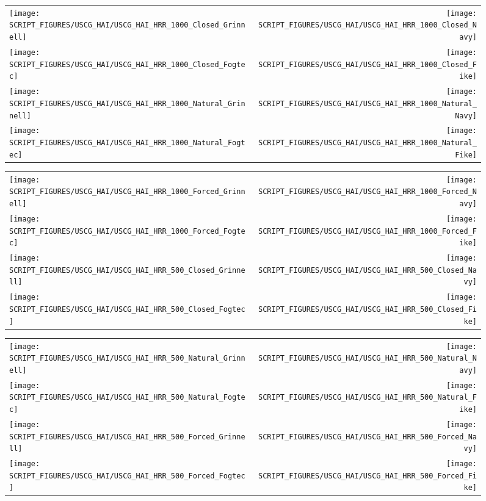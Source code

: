 


\newpage

\begin{figure}[p]
\begin{tabular*}{\textwidth}{l@{\extracolsep{\fill}}r}
\texttt{[image: SCRIPT\_FIGURES/USCG\_HAI/USCG\_HAI\_HRR\_1000\_Closed\_Grinnell]} &
\texttt{[image: SCRIPT\_FIGURES/USCG\_HAI/USCG\_HAI\_HRR\_1000\_Closed\_Navy]} \\
\texttt{[image: SCRIPT\_FIGURES/USCG\_HAI/USCG\_HAI\_HRR\_1000\_Closed\_Fogtec]} &
\texttt{[image: SCRIPT\_FIGURES/USCG\_HAI/USCG\_HAI\_HRR\_1000\_Closed\_Fike]} \\
\texttt{[image: SCRIPT\_FIGURES/USCG\_HAI/USCG\_HAI\_HRR\_1000\_Natural\_Grinnell]} &
\texttt{[image: SCRIPT\_FIGURES/USCG\_HAI/USCG\_HAI\_HRR\_1000\_Natural\_Navy]} \\
\texttt{[image: SCRIPT\_FIGURES/USCG\_HAI/USCG\_HAI\_HRR\_1000\_Natural\_Fogtec]} &
\texttt{[image: SCRIPT\_FIGURES/USCG\_HAI/USCG\_HAI\_HRR\_1000\_Natural\_Fike]}
\end{tabular*}
\label{USCG_HAI_2}
\end{figure}

\begin{figure}[p]
\begin{tabular*}{\textwidth}{l@{\extracolsep{\fill}}r}
\texttt{[image: SCRIPT\_FIGURES/USCG\_HAI/USCG\_HAI\_HRR\_1000\_Forced\_Grinnell]} &
\texttt{[image: SCRIPT\_FIGURES/USCG\_HAI/USCG\_HAI\_HRR\_1000\_Forced\_Navy]} \\
\texttt{[image: SCRIPT\_FIGURES/USCG\_HAI/USCG\_HAI\_HRR\_1000\_Forced\_Fogtec]} &
\texttt{[image: SCRIPT\_FIGURES/USCG\_HAI/USCG\_HAI\_HRR\_1000\_Forced\_Fike]} \\
\texttt{[image: SCRIPT\_FIGURES/USCG\_HAI/USCG\_HAI\_HRR\_500\_Closed\_Grinnell]} &
\texttt{[image: SCRIPT\_FIGURES/USCG\_HAI/USCG\_HAI\_HRR\_500\_Closed\_Navy]} \\
\texttt{[image: SCRIPT\_FIGURES/USCG\_HAI/USCG\_HAI\_HRR\_500\_Closed\_Fogtec]} &
\texttt{[image: SCRIPT\_FIGURES/USCG\_HAI/USCG\_HAI\_HRR\_500\_Closed\_Fike]}
\end{tabular*}
\label{USCG_HAI_4}
\end{figure}

\begin{figure}[p]
\begin{tabular*}{\textwidth}{l@{\extracolsep{\fill}}r}
\texttt{[image: SCRIPT\_FIGURES/USCG\_HAI/USCG\_HAI\_HRR\_500\_Natural\_Grinnell]} &
\texttt{[image: SCRIPT\_FIGURES/USCG\_HAI/USCG\_HAI\_HRR\_500\_Natural\_Navy]} \\
\texttt{[image: SCRIPT\_FIGURES/USCG\_HAI/USCG\_HAI\_HRR\_500\_Natural\_Fogtec]} &
\texttt{[image: SCRIPT\_FIGURES/USCG\_HAI/USCG\_HAI\_HRR\_500\_Natural\_Fike]} \\
\texttt{[image: SCRIPT\_FIGURES/USCG\_HAI/USCG\_HAI\_HRR\_500\_Forced\_Grinnell]} &
\texttt{[image: SCRIPT\_FIGURES/USCG\_HAI/USCG\_HAI\_HRR\_500\_Forced\_Navy]} \\
\texttt{[image: SCRIPT\_FIGURES/USCG\_HAI/USCG\_HAI\_HRR\_500\_Forced\_Fogtec]} &
\texttt{[image: SCRIPT\_FIGURES/USCG\_HAI/USCG\_HAI\_HRR\_500\_Forced\_Fike]}
\end{tabular*}
\label{USCG_HAI_6}
\end{figure}

